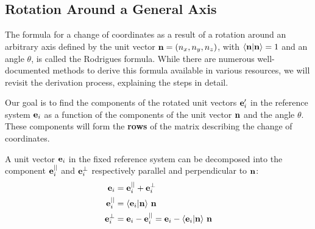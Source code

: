 \documentclass[12pt]{article}
\begin{document}
\subsection{Rotation Around a General Axis}

The formula for a change of coordinates as a result of a rotation around an arbitrary axis
defined by the unit vector $\vb{n} = (n_x, n_y, n_z)$, with $\ip{\vb{n}}{\vb{n}} = 1$
and an angle $\theta$, is called the Rodrigues formula. While there are numerous
well-documented methods to derive this formula available in various resources, we will revisit
the derivation process, explaining the steps in detail.

Our goal is to find the components of the rotated unit vectors $\vb{e}'_i$ in the reference
system $\vb{e}_i$ as a function of the components of the unit vector $\vb{n}$ and the angle
$\theta$. These components will form the \textbf{rows} of the matrix describing the change of
coordinates.

A unit vector $\vb{e}_i$ in the fixed reference system can be decomposed into the component
$\vb{e}_i^{||}$ and $\vb{e}_i^{\perp}$ respectively parallel and perpendicular to $\vb{n}$:
\begin{align}
  \vb{e}_i &= \vb{e}_i^{||} + \vb{e}_i^{\perp} \\
  \vb{e}_i^{||} &= \ip{\vb{e}_i}{\vb{n}}\,\vb{n} \\
  \vb{e}_i^{\perp} &= \vb{e}_i - \vb{e}_i^{||} = \vb{e}_i - \ip{\vb{e}_i}{\vb{n}}\,\vb{n}
\end{align}
\end{document}
